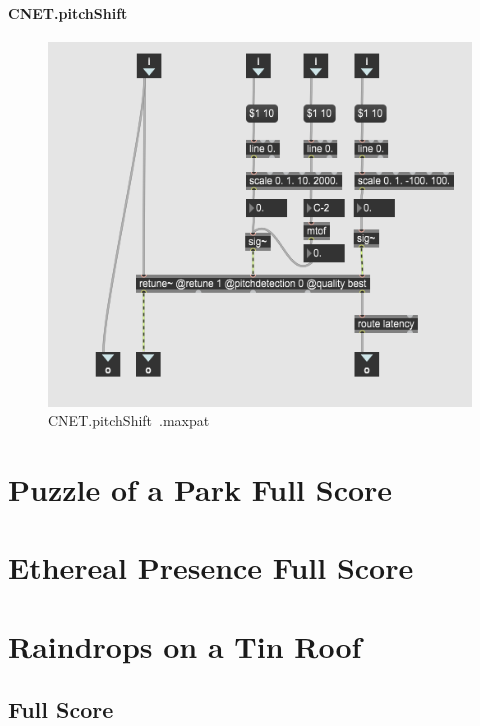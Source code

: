 \subsubsection{CNET.pitchShift~}

\begin{figure}
    \centering
    \includegraphics{diagrams/maxPatches/CNET.pitchShift~.png}
    \caption{CNET.pitchShift~.maxpat}
    \label{fig:pitchshift}
\end{figure}


\chapter{Puzzle of a Park Full Score}



\chapter{Ethereal Presence Full Score}



\chapter{Raindrops on a Tin Roof}

\section{Full Score}

